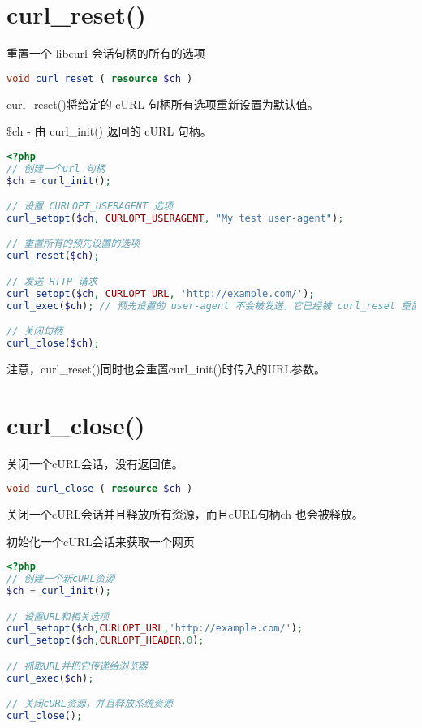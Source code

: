 \section{curl\_reset()}

重置一个 libcurl 会话句柄的所有的选项


\begin{lstlisting}[language=PHP]
void curl_reset ( resource $ch )
\end{lstlisting}

curl\_reset()将给定的 cURL 句柄所有选项重新设置为默认值。

\begin{compactitem}
\item \$ch - 由 curl\_init() 返回的 cURL 句柄。
\end{compactitem}


\begin{lstlisting}[language=PHP]
<?php
// 创建一个url 句柄
$ch = curl_init();

// 设置 CURLOPT_USERAGENT 选项
curl_setopt($ch, CURLOPT_USERAGENT, "My test user-agent");

// 重置所有的预先设置的选项
curl_reset($ch);

// 发送 HTTP 请求
curl_setopt($ch, CURLOPT_URL, 'http://example.com/');
curl_exec($ch); // 预先设置的 user-agent 不会被发送，它已经被 curl_reset 重置掉了

// 关闭句柄
curl_close($ch);
\end{lstlisting}

注意，curl\_reset()同时也会重置curl\_init()时传入的URL参数。

\section{curl\_close()}

关闭一个cURL会话，没有返回值。


\begin{lstlisting}[language=PHP]
void curl_close ( resource $ch )
\end{lstlisting}

关闭一个cURL会话并且释放所有资源，而且cURL句柄ch 也会被释放。

\begin{example}
初始化一个cURL会话来获取一个网页
\begin{lstlisting}[language=PHP]
<?php
// 创建一个新cURL资源
$ch = curl_init();

// 设置URL和相关选项
curl_setopt($ch,CURLOPT_URL,'http://example.com/');
curl_setopt($ch,CURLOPT_HEADER,0);

// 抓取URL并把它传递给浏览器
curl_exec($ch);

// 关闭cURL资源，并且释放系统资源
curl_close();
\end{lstlisting}
\end{example}


